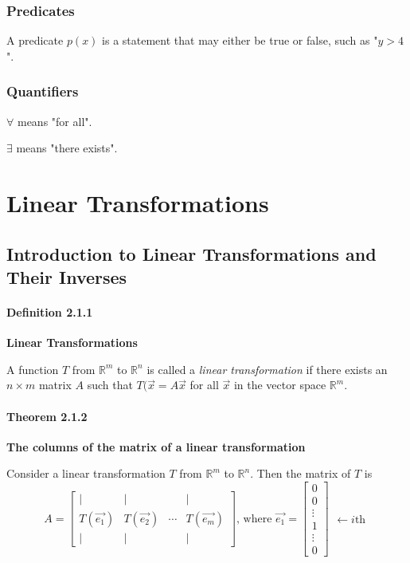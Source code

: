\documentclass{report}
\begin{document}
\subsection*{Predicates}
\par\noindent A predicate $p(x)$ is a statement that may either be true or false, such as "$y>4$".
\subsection*{Quantifiers}
\par\noindent $\forall$ means "for all".
\par\noindent $\exists$ means "there exists".

\chapter{Linear Transformations}

\section{Introduction to Linear Transformations and Their Inverses}
\subsubsection*{Definition 2.1.1}
\par\noindent\textbf{Linear Transformations}
\par\noindent A function $T$ from $\mathbb{R}^{m}$ to $\mathbb{R}^{n}$ is called a \textit{linear transformation} if there exists an $n\times{}m$ matrix $A$ such that $T(\vec{x}=A\vec{x}$ for all $\vec{x}$ in the vector space $\mathbb{R}^{m}$.
\subsubsection*{Theorem 2.1.2}
\par\noindent\textbf{The columns of the matrix of a linear transformation}
\par\noindent Consider a linear transformation $T$ from $\mathbb{R}^{m}$ to $\mathbb{R}^{n}$. Then the matrix of $T$ is
\[A=\left[\begin{array}{cccc}|&|& &|\\ T(\vec{e_{1}})& T(\vec{e_{2}})& \cdots{}& T(\vec{e_{m}})\\ |&|& &|\end{array}\right]\textrm{, where }\vec{e_{1}}=\left[\begin{array}{c}0\\ 0\\ \vdots{}\\ 1\\ \vdots{}\\ 0\end{array}\right]\begin{array}{l}\\ \\ \\ \leftarrow{}i\textrm{th}\\ \\ \\ \end{array}\]
\end{document}
